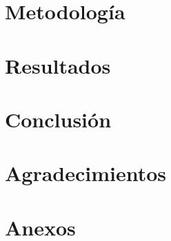 \documentclass[conference]{IEEEtran}
\begin{document}
\section{Metodología}

\section{Resultados}

\section{Conclusión}

\section{Agradecimientos}

\nocite{*}




\section*{Anexos}
\end{document}

